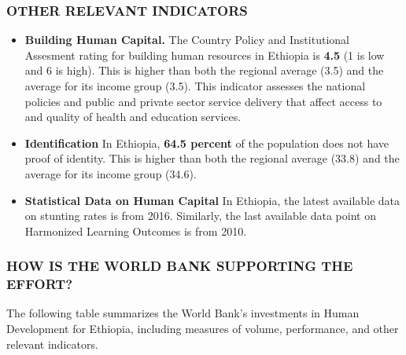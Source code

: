 \documentclass[9.2pt,twocolumn]{article}
\begin{document}
\hypertarget{section-3}{%
\subsubsection{\texorpdfstring{\textcolor{bondiblue}{\textbf{O\small{THER RELEVANT INDICATORS }}}}{}}\label{section-3}}

\begin{itemize}
\item
  \textbf{Building Human Capital.} The Country Policy and Institutional
  Assesment rating for building human resources in Ethiopia is
  \textbf{4.5} (1 is low and 6 is high). This is higher than both the
  regional average (3.5) and the average for its income group (3.5).
  This indicator assesses the national policies and public and private
  sector service delivery that affect access to and quality of health
  and education services.
\item
  \textbf{Identification} In Ethiopia, \textbf{64.5 percent} of the
  population does not have proof of identity. This is higher than both
  the regional average (33.8) and the average for its income group
  (34.6).
\item
  \textbf{Statistical Data on Human Capital} In Ethiopia, the latest
  available data on stunting rates is from 2016. Similarly, the last
  available data point on Harmonized Learning Outcomes is from 2010.
\end{itemize}

\hypertarget{section-4}{%
\subsubsection{\texorpdfstring{\textcolor{bondiblue}{\textbf{H\small{OW IS THE WORLD BANK SUPPORTING THE EFFORT?}}}}{}}\label{section-4}}

The following table summarizes the World Bank's investments in Human
Development for Ethiopia, including measures of volume, performance, and
other relevant indicators.
\end{document}
